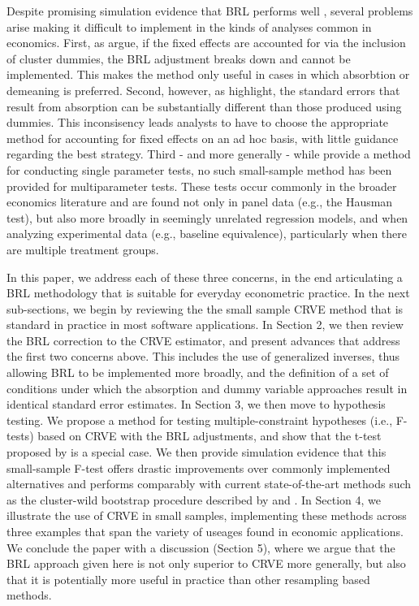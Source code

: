 \documentclass[12pt]{article}
\begin{document}
Despite promising simulation evidence that BRL performs well \citep[e.g.,][]{Imbens2012robust}, several problems arise making it difficult to implement in the kinds of analyses common in economics. 
First, as \citet{Angrist2009mostly} argue, if the fixed effects are accounted for via the inclusion of cluster dummies, the BRL adjustment breaks down and cannot be implemented. 
This makes the method only useful in cases in which absorbtion or demeaning is preferred.
Second, however, as \citet{Cameron2015practitioners} highlight, the standard errors that result from absorption can be substantially different than those produced using dummies. 
This inconsisency leads analysts to have to choose the appropriate method for accounting for fixed effects on an ad hoc basis, with little guidance regarding the best strategy.
Third - and more generally - while \citet{Bell2002bias} provide a method for conducting single parameter tests, no such small-sample method has been provided for multiparameter tests.
These tests occur commonly in the broader economics literature and are found not only in panel data (e.g., the Hausman test), but also more broadly in seemingly unrelated regression models, and when analyzing experimental data (e.g., baseline equivalence), particularly when there are multiple treatment groups. 

In this paper, we address each of these three concerns, in the end articulating a BRL methodology that is suitable for everyday econometric practice. 
In the next sub-sections, we begin by reviewing the the small sample CRVE method that is standard in practice in most software applications. 
In Section 2, we then review the BRL correction to the CRVE estimator, and present advances that address the first two concerns above.
This includes the use of generalized inverses, thus allowing BRL to be implemented more broadly, and the definition of a set of conditions under which the absorption and dummy variable approaches result in identical standard error estimates. 
In Section 3, we then move to hypothesis testing. 
We propose a method for testing multiple-constraint hypotheses (i.e., F-tests) based on CRVE with the BRL adjustments, and show that the t-test proposed by \citet{Bell2002bias} is a special case. 
We then provide simulation evidence that this small-sample F-test offers drastic improvements over commonly implemented alternatives and performs comparably with current state-of-the-art methods such as the cluster-wild bootstrap procedure described by \citet{Cameron2008bootstrap} and \citet{Webb2013wild}. 
In Section 4, we illustrate the use of CRVE in small samples, implementing these methods across three examples that span the variety of useages found in economic applications. 
We conclude the paper with a discussion (Section 5), where we argue that the BRL approach given here is not only superior to CRVE more generally, but also that it is potentially more useful in practice than other resampling based methods. 
\end{document}
